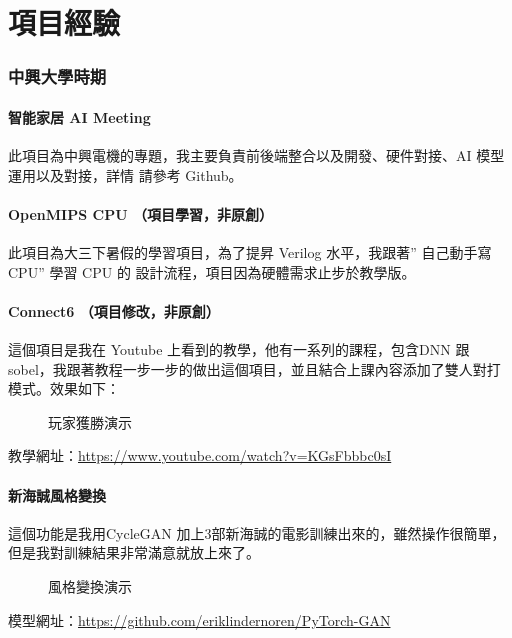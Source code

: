\documentclass[classical]{einfart}
\begin{document}
\part{項目經驗}

\section{中興大學時期}

\subsection{智能家居 AI Meeting}

此項目為中興電機的專題，我主要負責前後端整合以及開發、硬件對接、AI 模型運用以及對接，詳情
請參考 Github。

\subsection{OpenMIPS CPU （項目學習，非原創）}

此項目為大三下暑假的學習項目，為了提昇 Verilog 水平，我跟著” 自己動手寫 CPU” 學習 CPU 的
設計流程，項目因為硬體需求止步於教學版。

\subsection{Connect6 （項目修改，非原創）}

這個項目是我在 Youtube 上看到的教學，他有一系列的課程，包含DNN 跟 sobel，我跟著教程一步一步的做出這個項目，並且結合上課內容添加了雙人對打模式。效果如下：
\begin{figure}[H]
    \centering  %
    \caption{玩家獲勝演示}
    \label{Fig.main}
\end{figure}


教學網址：\url{https://www.youtube.com/watch?v=KGsFbbbc0sI}

\subsection{新海誠風格變換}

這個功能是我用CycleGAN 加上3部新海誠的電影訓練出來的，雖然操作很簡單，但是我對訓練結果非常滿意就放上來了。
\begin{figure}[H]
    \centering  %
    \caption{風格變換演示}
    \label{Fig.main}
\end{figure}
模型網址：\url{https://github.com/eriklindernoren/PyTorch-GAN}
\end{document}

